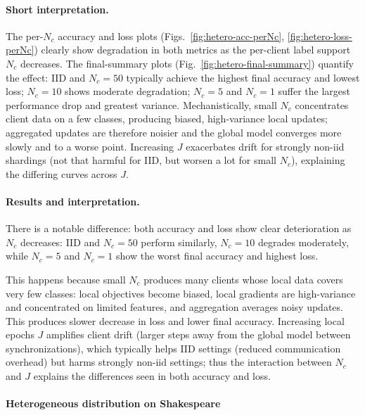 \documentclass[10pt,twocolumn,letterpaper]{article}
\begin{document}
\paragraph{Short interpretation.}
The per-\(N_c\) accuracy and loss plots (Figs.~\ref{fig:hetero-acc-perNc}, \ref{fig:hetero-loss-perNc}) clearly show degradation in both metrics as the per-client label support \(N_c\) decreases. \cite{hsu2019measuring,hsu2020federated} The final-summary plots (Fig.~\ref{fig:hetero-final-summary}) quantify the effect: IID and \(N_c=50\) typically achieve the highest final accuracy and lowest loss; \(N_c=10\) shows moderate degradation; \(N_c=5\) and \(N_c=1\) suffer the largest performance drop and greatest variance. Mechanistically, small \(N_c\) concentrates client data on a few classes, producing biased, high-variance local updates; aggregated updates are therefore noisier and the global model converges more slowly and to a worse point. Increasing \(J\) exacerbates drift for strongly non-iid shardings (not that harmful for IID, but worsen a lot for small \(N_c\)), explaining the differing curves across \(J\).




\paragraph{Results and interpretation.}
There is a notable difference: both accuracy and loss show clear deterioration as \(N_c\) decreases: IID and \(N_c=50\) perform similarly, \(N_c=10\) degrades moderately, while \(N_c=5\) and \(N_c=1\) show the worst final accuracy and highest loss. 

This happens because small \(N_c\) produces many clients whose local data covers very few classes: local objectives become biased, local gradients are high-variance and concentrated on limited features, and aggregation averages noisy updates. This produces slower decrease in loss and lower final accuracy. Increasing local epochs \(J\) amplifies client drift (larger steps away from the global model between synchronizations), which typically helps IID settings (reduced communication overhead) but harms strongly non-iid settings; thus the interaction between \(N_c\) and \(J\) explains the differences seen in both accuracy and loss. \cite{li2018federated,karimireddy2020scaffold}



\paragraph{Heterogeneous distribution on Shakespeare}
\label{sec:shakespeare-hetero}
\end{document}
